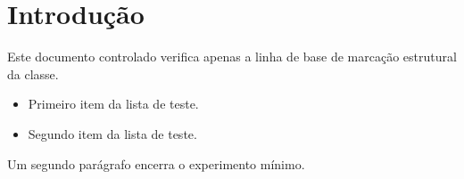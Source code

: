 \documentclass{abntexto-ufc}
\begin{document}
\textual

\section{Introdução}

Este documento controlado verifica apenas a linha de base de marcação estrutural da classe.

\begin{itemize}
  \item Primeiro item da lista de teste.
  \item Segundo item da lista de teste.
\end{itemize}

Um segundo parágrafo encerra o experimento mínimo.
\end{document}

